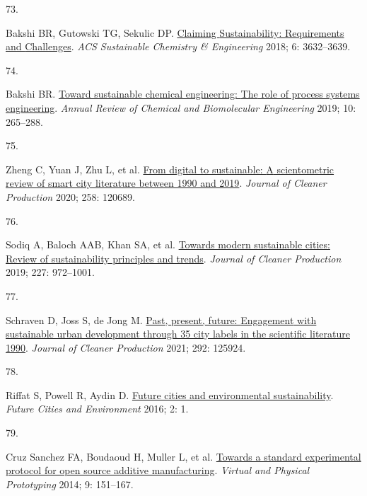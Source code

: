 \documentclass[
  12pt,
  a4paperpaper,
  onecolumn]{article}
\newlength{\cslhangindent}
\newlength{\csllabelwidth}
\newlength{\cslentryspacingunit} %
\newenvironment{CSLReferences}[2] %
 {%
  \setlength{\parindent}{0pt}
  \ifodd #1
  \let\oldpar\par
  \def\par{\hangindent=\cslhangindent\oldpar}
  \fi
  \setlength{\parskip}{#2\cslentryspacingunit}
 }%
 {}
\newcommand{\CSLLeftMargin}[1]{\parbox[t]{\csllabelwidth}{#1}}
\newcommand{\CSLRightInline}[1]{\parbox[t]{\linewidth - \csllabelwidth}{#1}\break}
\begin{document}
\begin{CSLReferences}{0}{0}
\leavevmode{}%
\CSLLeftMargin{73. }%
\CSLRightInline{Bakshi BR, Gutowski TG, Sekulic DP.
\href{https://doi.org/10.1021/acssuschemeng.7b03953}{Claiming
{Sustainability}: {Requirements} and {Challenges}}. \emph{ACS
Sustainable Chemistry \& Engineering} 2018; 6: 3632--3639.}

\leavevmode{}%
\CSLLeftMargin{74. }%
\CSLRightInline{Bakshi BR.
\href{https://doi.org/10.1146/annurev-chembioeng-060718-030332}{Toward
sustainable chemical engineering: {The} role of process systems
engineering}. \emph{Annual Review of Chemical and Biomolecular
Engineering} 2019; 10: 265--288.}

\leavevmode{}%
\CSLLeftMargin{75. }%
\CSLRightInline{Zheng C, Yuan J, Zhu L, et al.
\href{https://doi.org/10.1016/j.jclepro.2020.120689}{From digital to
sustainable: {A} scientometric review of smart city literature between
1990 and 2019}. \emph{Journal of Cleaner Production} 2020; 258: 120689.}

\leavevmode{}%
\CSLLeftMargin{76. }%
\CSLRightInline{Sodiq A, Baloch AAB, Khan SA, et al.
\href{https://doi.org/10.1016/j.jclepro.2019.04.106}{Towards modern
sustainable cities: {Review} of sustainability principles and trends}.
\emph{Journal of Cleaner Production} 2019; 227: 972--1001.}

\leavevmode{}%
\CSLLeftMargin{77. }%
\CSLRightInline{Schraven D, Joss S, de Jong M.
\href{https://doi.org/10.1016/j.jclepro.2021.125924}{Past, present,
future: {Engagement} with sustainable urban development through 35 city
labels in the scientific literature 1990\textendash 2019}. \emph{Journal
of Cleaner Production} 2021; 292: 125924.}

\leavevmode{}%
\CSLLeftMargin{78. }%
\CSLRightInline{Riffat S, Powell R, Aydin D.
\href{https://doi.org/10.1186/s40984-016-0014-2}{Future cities and
environmental sustainability}. \emph{Future Cities and Environment}
2016; 2: 1.}

\leavevmode{}%
\CSLLeftMargin{79. }%
\CSLRightInline{Cruz Sanchez FA, Boudaoud H, Muller L, et al.
\href{https://doi.org/10.1080/17452759.2014.919553}{Towards a standard
experimental protocol for open source additive manufacturing}.
\emph{Virtual and Physical Prototyping} 2014; 9: 151--167.}


\end{CSLReferences}
\end{document}
